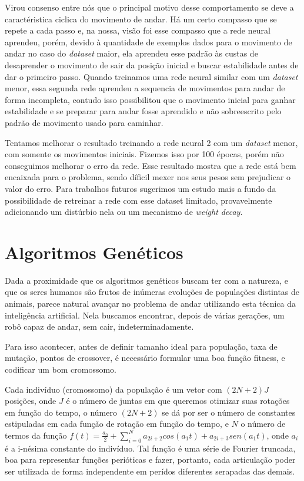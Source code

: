 \documentclass[twoside,conference,a4paper]{IEEEtran}
\begin{document}
Virou consenso entre nós que o principal motivo desse comportamento se deve a caractéristica ciclica do movimento de andar. Há um certo compasso que se repete a cada passo e, na nossa, visão foi esse compasso que a rede neural aprendeu, porém, devido à quantidade de exemplos dados para o movimento de andar no caso do \textsl{dataset} maior, ela aprendeu esse padrão às custas de desaprender o movimento de sair da posição inicial e buscar estabilidade antes de dar o primeiro passo. Quando treinamos uma rede neural similar com um \textsl{dataset} menor, essa segunda rede aprendeu a sequencia de movimentos para andar de forma incompleta, contudo isso possibilitou que o movimento inicial para ganhar estabilidade e se preparar para andar fosse aprendido e não sobreescrito pelo padrão de movimento usado para caminhar.

Tentamos melhorar o resultado treinando a rede neural 2 com um \textsl{dataset} menor, com somente os movimentos iniciais. Fizemos isso por 100 épocas, porém não conseguimos melhorar o erro da rede. Esse resultado mostra que a rede está bem encaixada para o problema, sendo díficil mexer nos seus pesos sem prejudicar o valor do erro. Para trabalhos futuros sugerimos um estudo mais a fundo da possibilidade de retreinar a rede com esse dataset limitado, provavelmente adicionando um distúrbio nela ou um mecanismo de \textsl{weight decay}\cite{hastie01statisticallearning}.

\section{Algoritmos Genéticos} \label{algoritmos_geneticos}
Dada a proximidade que os algoritmos genéticos buscam ter com a natureza, e que os seres humanos são frutos de inúmeras evoluções de populações distintas de animais, parece natural avançar no problema de andar utilizando esta técnica da inteligência artificial. Nela buscamos encontrar, depois de várias gerações, um robô capaz de andar, sem cair, indeterminadamente.

Para isso acontecer, antes de definir tamanho ideal para população, taxa de mutação, pontos de crossover, é necessário formular uma boa função fitness, e codificar um bom cromossomo.

Cada indivíduo (cromossomo) da população é um vetor com $(2N+2)J$ posições, onde $J$ é o número de juntas em que queremos otimizar suas rotações em função do tempo, o número $(2N+2)$ se dá por ser o número de constantes estipuladas em cada função de rotação em função do tempo, e $N$ o número de termos da função $f(t) = \frac{a_0}{2}+\sum_{i=0}^N a_{2i+2} cos(a_{1} t) + a_{2i+3} sen(a_{1} t)$, onde $a_i$ é a i-nésima constante do indivíduo. Tal função é uma série de Fourier truncada, boa para representar funções perióticas e fazer, portanto, cada articulação poder ser utilizada de forma independente em perídos diferentes serapadas das demais.
\end{document}
